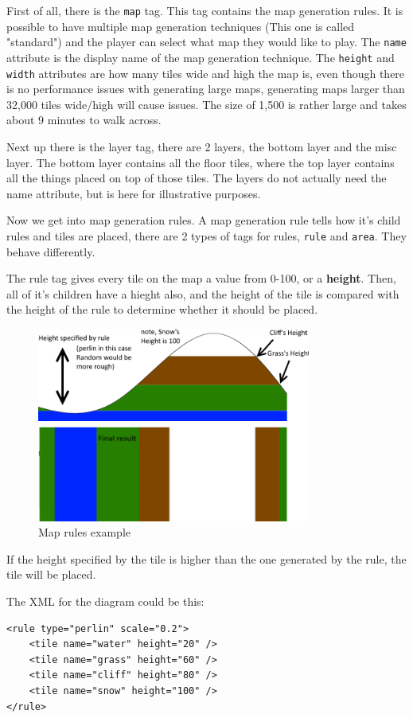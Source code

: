 \documentclass{book}
\begin{document}
First of all, there is the \texttt{map} tag. This tag contains the map generation rules. It is possible to have multiple map generation techniques (This one is called "standard") and the player can select what map they would like to play. The \texttt{name} attribute is the display name of the map generation technique. The \texttt{height} and \texttt{width} attributes are how many tiles wide and high the map is, even though there is no performance issues with generating large maps, generating maps larger than 32,000 tiles wide/high will cause issues. The size of 1,500 is rather large and takes about 9 minutes to walk across.

Next up there is the layer tag, there are 2 layers, the bottom layer and the misc layer. The bottom layer contains all the floor tiles, where the top layer contains all the things placed on top of those tiles. The layers do not actually need the name attribute, but is here for illustrative purposes.

Now we get into map generation rules. A map generation rule tells how it's child rules and tiles are placed, there are 2 types of tags for rules, \texttt{rule} and \texttt{area}. They behave differently.

The rule tag gives every tile on the map a value from 0-100, or a \textbf{height}. Then, all of it's children have a hieght also, and the height of the tile is compared with the height of the rule to determine whether it should be placed. 


\begin{figure}[ht!]
		\centering
		\includegraphics[width=90mm]{MapGenRules.png}
		\caption{Map rules example}
\end{figure}

If the height specified by the tile is higher than the one generated by the rule, the tile will be placed.

The XML for the diagram could be this:
\begin{verbatim}
<rule type="perlin" scale="0.2">
	<tile name="water" height="20" />
	<tile name="grass" height="60" />
	<tile name="cliff" height="80" />
	<tile name="snow" height="100" />
</rule>
\end{verbatim}
\end{document}
